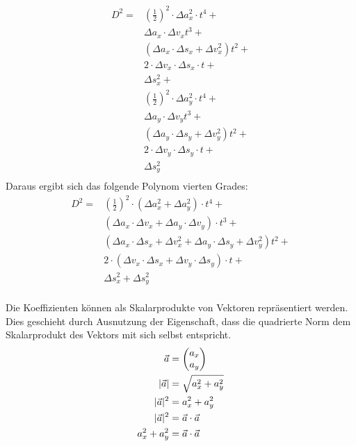 \begin{equation}
    \begin{split}
    D^2 = & (\frac{1}{2})^2 \cdot \Delta a_x^2 \cdot t^4 +\\\
    & \Delta a_x \cdot \Delta v_x t^3 +\\\
    & (\Delta a_x \cdot \Delta s_x + \Delta v_x^2) t^2 +\\\
    & 2 \cdot \Delta v_x \cdot \Delta s_x \cdot t +\\\
    & \Delta s_x^2 +\\
    & (\frac{1}{2})^2 \cdot \Delta a_y^2 \cdot t^4 +\\\
    & \Delta a_y \cdot \Delta v_y t^3 +\\\
    & (\Delta a_y \cdot \Delta s_y + \Delta v_y^2) t^2 +\\\
    & 2 \cdot \Delta v_y \cdot \Delta s_y \cdot t +\\\
    & \Delta s_y^2\\
    \end{split}
\end{equation}
Daraus ergibt sich das folgende Polynom vierten Grades:
\begin{equation}
    \begin{split}
    D^2 = & (\frac{1}{2})^2 \cdot (\Delta a_x^2 + \Delta a_y^2) \cdot t^4 +\\\
    & (\Delta a_x \cdot \Delta v_x + \Delta a_y \cdot \Delta v_y) \cdot t^3 +\\\
    & (\Delta a_x \cdot \Delta s_x + \Delta v_x^2 + \Delta a_y \cdot \Delta s_y + \Delta v_y^2) t^2 +\\\
    & 2 \cdot (\Delta v_x \cdot \Delta s_x + \Delta v_y \cdot \Delta s_y) \cdot t +\\\
    & \Delta s_x^2 + \Delta s_y^2\label{eq:dynamic_object_collision_event:03}\\\
    \end{split}
\end{equation}

Die Koeffizienten können als Skalarprodukte von Vektoren repräsentiert werden. Dies geschieht durch Ausnutzung der
Eigenschaft, dass die quadrierte Norm dem Skalarprodukt des Vektors mit sich selbst entspricht.
\begin{align}
    \vec{a} &= \begin{pmatrix}a_x\\a_y\end{pmatrix}\\
    \lvert \vec{a} \rvert &= \sqrt{a_x^2 + a_y^2}\\
    \lvert \vec{a} \rvert^2 &= a_x^2 + a_y^2\\
    \lvert \vec{a} \rvert^2 &= \vec{a} \cdot \vec{a}\\
    a_x^2 + a_y^2 &= \vec{a} \cdot \vec{a}\label{eq:dynamic_object_collision_event:04}
 \end{align}

